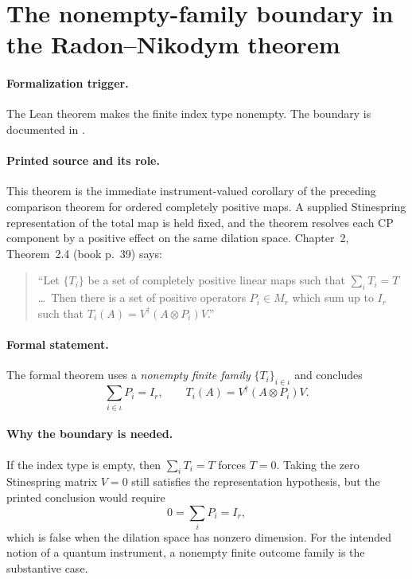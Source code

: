 \documentclass{article}
\begin{document}
\section{The nonempty-family boundary in the Radon--Nikodym theorem}
\label{sec:radon-nikodym}

\paragraph{Formalization trigger.}
The Lean theorem
 makes the finite index type
nonempty. The boundary is documented in
.

\paragraph{Printed source and its role.}
This theorem is the immediate instrument-valued corollary of the preceding
comparison theorem for ordered completely positive maps.  A supplied
Stinespring representation of the total map is held fixed, and the theorem
resolves each CP component by a positive effect on the same dilation space.
Chapter~2, Theorem~2.4 (book p.~39) says:
\begin{quote}
``Let $\{T_i\}$ be a set of completely positive linear maps such that
$\sum_iT_i=T$ \ldots\ Then there is a set of positive operators $P_i\in M_r$
which sum up to $I_r$ such that
$T_i(A)=V^\dagger(A\otimes P_i)V$.''
\end{quote}

\paragraph{Formal statement.}
The formal theorem uses a \emph{nonempty finite family}
$\{T_i\}_{i\in\iota}$ and concludes
\begin{equation}
  \sum_{i\in\iota}P_i=I_r,
  \qquad
  T_i(A)=V^\dagger(A\otimes P_i)V.
\end{equation}

\paragraph{Why the boundary is needed.}
If the index type is empty, then $\sum_iT_i=T$ forces $T=0$. Taking the zero
Stinespring matrix $V=0$ still satisfies the representation hypothesis, but the
printed conclusion would require
\begin{equation}
  0=\sum_iP_i=I_r,
\end{equation}
which is false when the dilation space has nonzero dimension. For the intended
notion of a quantum instrument, a nonempty finite outcome family is the
substantive case.
\end{document}
